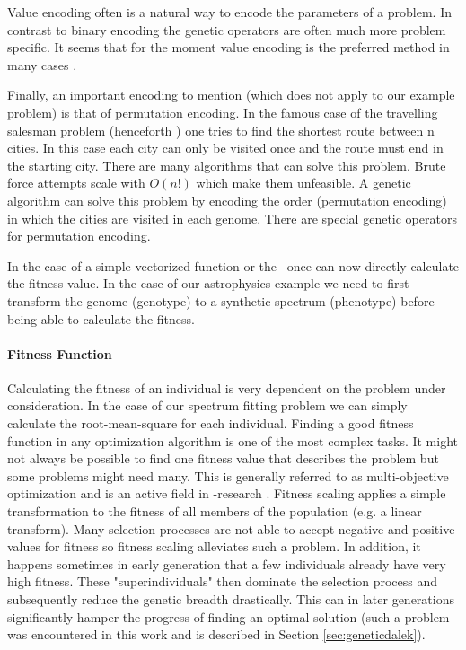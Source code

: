 Value encoding often is a natural way to encode the parameters of a problem. In contrast to binary encoding the genetic operators are often much more problem specific. It seems that for the moment value encoding is the preferred method in many cases \citep[e.g.][]{Janikow1991Comparison,Wright91geneticalgorithms}.

Finally, an important encoding to mention (which does not apply to our example problem) is that of permutation encoding. In the famous case of the travelling salesman problem (henceforth \tsp) one tries to find the shortest route between n cities. In this case each city can only be visited once and the route must end in the starting city. There are many algorithms that can solve this problem. Brute force attempts scale with $O(n!)$ which make them unfeasible. A genetic algorithm can solve this problem by encoding the order (permutation encoding) in which the cities are visited in each genome. There are special genetic operators for permutation encoding. 

In the case of a simple vectorized function or the \tsp\ once can now directly calculate the fitness value. In the case of our astrophysics example we need to first transform the genome (genotype) to a synthetic spectrum (phenotype) before being able to calculate the fitness.

\paragraph{Fitness Function}
Calculating the fitness of an individual is very dependent on the problem under consideration. In the case of our spectrum fitting problem we can simply calculate the root-mean-square for each individual. Finding a good fitness function in any optimization algorithm is one of the most complex tasks. It might not always be possible to find one fitness value that describes the problem but some problems might need many. This is generally referred to as multi-objective optimization and is an active field in \ga-research \citep{citeulike:1300532}. Fitness scaling applies a simple transformation to the fitness of all members of the population (e.g. a linear transform). Many selection processes are not able to accept negative and positive values for fitness so fitness scaling alleviates such a problem. In addition, it happens sometimes in early generation that a few individuals already have very high fitness. These "superindividuals" then dominate the selection process and subsequently reduce the genetic breadth  drastically. This can in later generations significantly hamper the progress of finding an optimal solution (such a problem was encountered in this work and is described in Section \ref{sec:geneticdalek}). 

